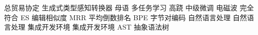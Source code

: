 \documentclass[UTF8]{article}
\begin{document}
        { 总贸易协定 }   { 生成式类型感知转换器 } 
         { 母语 }   { 多任务学习 } 
         { 高跷 }   { 中级微调 } 
         { 电磁波 }   { 完全符合 } 
         { ES }   { 编辑相似度 } 
         { MRR }   { 平均倒数排名 } 
         { BPE }   { 字节对编码    \cite{sennrich2015neural}    } 
         { 自然语言处理 }   { 自然语言处理 } 
         { 集成开发环境 }   { 集成开发环境 } 
         { AST }   { 抽象语法树 } 
\end{document}
